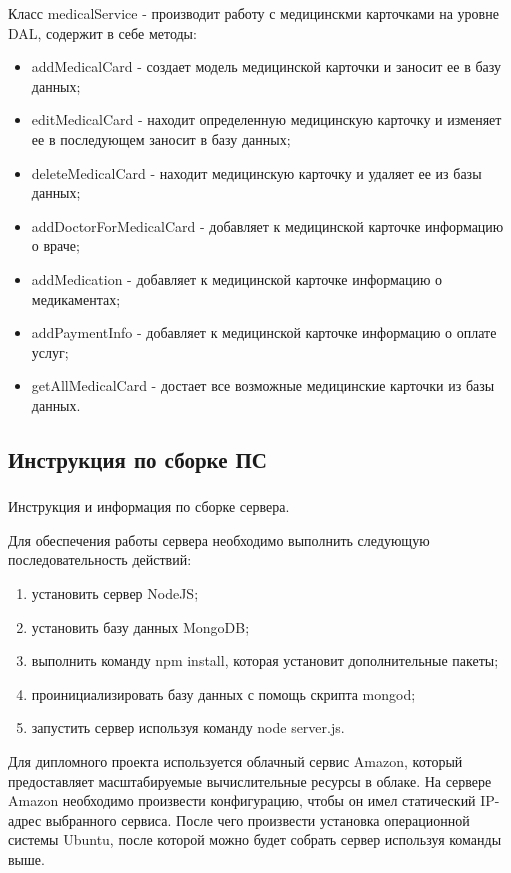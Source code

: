 Класс medicalService - производит работу с медицинскми карточками на уровне DAL, содержит в себе методы:
\begin{itemize}
  \item addMedicalCard - создает модель медицинской карточки и заносит ее в базу данных;
  \item editMedicalCard - находит определенную медицинскую карточку и изменяет ее в последующем заносит в базу данных;
  \item deleteMedicalCard - находит медицинскую карточку и удаляет ее из базы данных;
  \item addDoctorForMedicalCard - добавляет к медицинской карточке информацию о враче;
  \item addMedication - добавляет к медицинской карточке информацию о медикаментах;
  \item addPaymentInfo - добавляет к медицинской карточке информацию о оплате услуг;
  \item getAllMedicalCard - достает все возможные медицинские карточки из базы данных.
\end{itemize}

\subsection{Инструкция по сборке ПС}
\label{sub:arch_and_mod:sbor}

\subsubsection{}Инструкция и информация по сборке сервера.


Для обеспечения работы сервера необходимо выполнить следующую последовательность действий:
\begin{enumerate}
\item установить сервер NodeJS;
\item установить базу данных MongoDB;
\item выполнить команду npm install, которая установит дополнительные пакеты;
\item проинициализировать базу данных с помощь скрипта mongod;
\item запустить сервер используя команду node server.js.
\end{enumerate}

Для дипломного проекта используется облачный сервис Amazon, который предоставляет масштабируемые вычислительные ресурсы в облаке. На сервере Amazon необходимо произвести конфигурацию, чтобы он имел статический IP-адрес выбранного сервиса. После чего произвести установка операционной системы Ubuntu, после которой можно будет собрать сервер используя команды выше.

